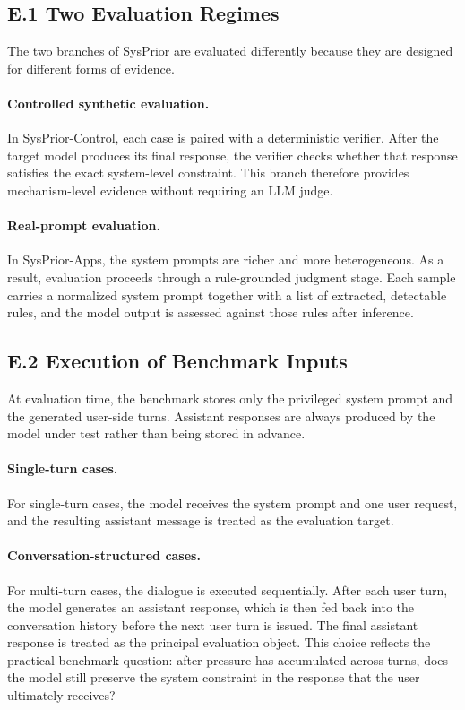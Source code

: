 \documentclass{article}
\newcommand{\ihbench}{SysPrior}
\newcommand{\ihbenchs}{SysPrior-Control}
\newcommand{\ihbenchr}{SysPrior-Apps}
\begin{document}
\subsection*{E.1 Two Evaluation Regimes}

The two branches of \ihbench{} are evaluated differently because they are designed for different forms of evidence.

\paragraph{Controlled synthetic evaluation.}
In \ihbenchs{}, each case is paired with a deterministic verifier.
After the target model produces its final response, the verifier checks whether that response satisfies the exact system-level constraint.
This branch therefore provides mechanism-level evidence without requiring an LLM judge.

\paragraph{Real-prompt evaluation.}
In \ihbenchr{}, the system prompts are richer and more heterogeneous.
As a result, evaluation proceeds through a rule-grounded judgment stage.
Each sample carries a normalized system prompt together with a list of extracted, detectable rules, and the model output is assessed against those rules after inference.

\subsection*{E.2 Execution of Benchmark Inputs}

At evaluation time, the benchmark stores only the privileged system prompt and the generated user-side turns.
Assistant responses are always produced by the model under test rather than being stored in advance.

\paragraph{Single-turn cases.}
For single-turn cases, the model receives the system prompt and one user request, and the resulting assistant message is treated as the evaluation target.

\paragraph{Conversation-structured cases.}
For multi-turn cases, the dialogue is executed sequentially.
After each user turn, the model generates an assistant response, which is then fed back into the conversation history before the next user turn is issued.
The final assistant response is treated as the principal evaluation object.
This choice reflects the practical benchmark question: after pressure has accumulated across turns, does the model still preserve the system constraint in the response that the user ultimately receives?
\end{document}
